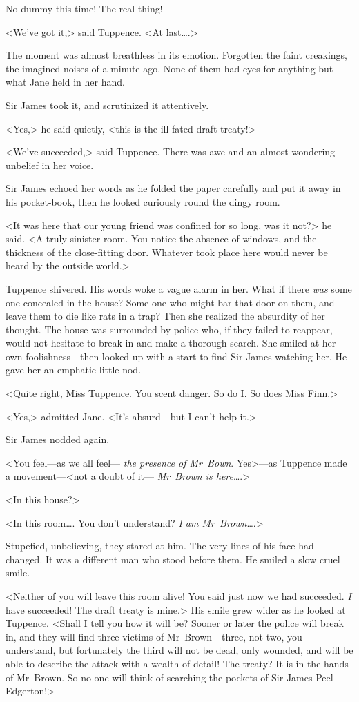 No dummy this time! The real thing!

<We've got it,> said Tuppence. <At last\dots.>

The moment was almost breathless in its emotion. Forgotten the faint creakings, the imagined noises of a minute ago. None of them had eyes for anything but what Jane held in her hand.

Sir James took it, and scrutinized it attentively.

<Yes,> he said quietly, <this is the ill-fated draft treaty!>

<We've succeeded,> said Tuppence. There was awe and an almost wondering unbelief in her voice.

Sir James echoed her words as he folded the paper carefully and put it away in his pocket-book, then he looked curiously round the dingy room.

<It was here that our young friend was confined for so long, was it not?> he said. <A truly sinister room. You notice the absence of windows, and the thickness of the close-fitting door. Whatever took place here would never be heard by the outside world.>

Tuppence shivered. His words woke a vague alarm in her. What if there \emph{was} some one concealed in the house? Some one who might bar that door on them, and leave them to die like rats in a trap? Then she realized the absurdity of her thought. The house was surrounded by police who, if they failed to reappear, would not hesitate to break in and make a thorough search. She smiled at her own foolishness—then looked up with a start to find Sir James watching her. He gave her an emphatic little nod.

<Quite right, Miss Tuppence. You scent danger. So do I. So does Miss Finn.>

<Yes,> admitted Jane. <It's absurd—but I can't help it.>

Sir James nodded again.

<You feel—as we all feel— \emph{the presence of Mr~Bown}. Yes>—as Tuppence made a movement—<not a doubt of it— \emph{Mr~Brown is here}\dots.>

<In this house?>

<In this room\dots. You don't understand? \emph{I am Mr~Brown}\dots.>

Stupefied, unbelieving, they stared at him. The very lines of his face had changed. It was a different man who stood before them. He smiled a slow cruel smile.

<Neither of you will leave this room alive! You said just now we had succeeded. \emph{I} have succeeded! The draft treaty is mine.> His smile grew wider as he looked at Tuppence. <Shall I tell you how it will be? Sooner or later the police will break in, and they will find three victims of Mr~Brown—three, not two, you understand, but fortunately the third will not be dead, only wounded, and will be able to describe the attack with a wealth of detail! The treaty? It is in the hands of Mr~Brown. So no one will think of searching the pockets of Sir James Peel Edgerton!>

